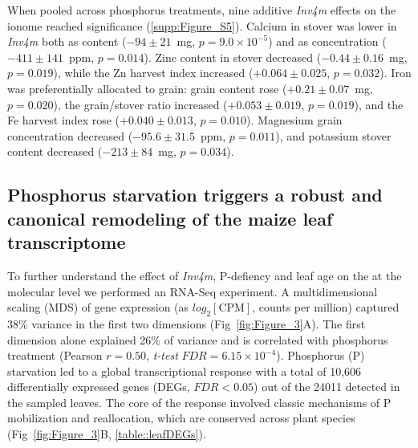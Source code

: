 \documentclass[9pt,twocolumn,twoside]{rilabRxiv}
\newcommand{\invfour}{\textit{Inv4m}\xspace}
\begin{document}
When pooled across phosphorus treatments, nine additive \invfour effects on the ionome reached significance (\ref{supp:Figure_S5}).
Calcium in stover was lower in \invfour both as content ($-94 \pm 21$~mg, $p = 9.0 \times 10^{-5}$) and as concentration ($-411 \pm 141$~ppm, $p = 0.014$).
Zinc content in stover decreased ($-0.44 \pm 0.16$~mg, $p = 0.019$), while the Zn harvest index increased ($+0.064 \pm 0.025$, $p = 0.032$).
Iron was preferentially allocated to grain: grain content rose ($+0.21 \pm 0.07$~mg, $p = 0.020$), the grain/stover ratio increased ($+0.053 \pm 0.019$, $p = 0.019$), and the Fe harvest index rose ($+0.040 \pm 0.013$, $p = 0.010$).
Magnesium grain concentration decreased ($-95.6 \pm 31.5$~ppm, $p = 0.011$), and potassium stover content decreased ($-213 \pm 84$~mg, $p = 0.034$).

\subsection*{Phosphorus starvation triggers a robust and canonical remodeling of the maize leaf transcriptome}

To further understand the effect of \invfour, P-defiency and leaf age on the at the molecular level we performed an RNA-Seq experiment. 
A multidimensional scaling (MDS) of gene expression (as $log_2[\text{CPM}]$, counts per million) captured 38\% variance in the first two dimensions (Fig~\ref{fig:Figure_3}A).
The first dimension alone explained 26\% of variance and is correlated with phosphorus treatment (Pearson $r=0.50$, \textit{t-test} $\textit{FDR} = 6.15 \times 10^{-4}$).
Phosphorus (P) starvation led to a global transcriptional response with a total of 10,606 differentially expressed genes (DEGs, $\textit{FDR} < 0.05$) out of the 24011 detected in the sampled leaves.
The core of the response involved classic mechanisms of P mobilization and reallocation, which are conserved across plant species (Fig~\ref{fig:Figure_3}B, \ref{table::leafDEGs}).
\end{document}
